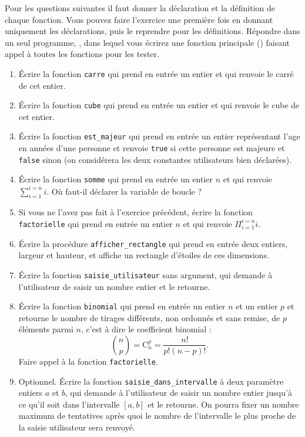 Pour les questions suivantes il faut donner la déclaration et la
définition de chaque fonction. Vous pouvez faire l'exercice une
première fois en donnant uniquement les déclarations, puis le
reprendre pour les définitions. Répondre dans un seul programme, , dans
lequel vous écrirez une fonction principale () faisant appel à
toutes les fonctions pour les tester.
\begin{enumerate}
\item Écrire la fonction \verb|carre| qui prend en entrée un entier et qui renvoie le carré de cet entier.
\item Écrire la fonction \verb|cube| qui prend en entrée un entier et qui renvoie le cube de cet entier.
\item Écrire la fonction \verb|est_majeur| qui prend en entrée un entier représentant l'age en années d'une personne et renvoie \verb|true| si cette personne est majeure et \verb|false| sinon (on considérera les deux constantes utilisateurs bien déclarées).
\item Écrire la fonction \verb|somme| qui prend en entrée un entier
  $n$ et qui renvoie $\sum_{i=1}^{i=n} i$. Où faut-il déclarer la
  variable de boucle ?
\item Si vous ne l'avez pas fait à l'exercice précédent, écrire la fonction \verb|factorielle| qui prend en entrée un entier
  $n$ et qui renvoie $\Pi_{i=1}^{i=n} i$.
\item Écrire la procédure \verb|afficher_rectangle| qui prend en
  entrée deux entiers, largeur et hauteur, et affiche un rectangle
  d'étoiles de ces dimensions.
\item Écrire la fonction \verb|saisie_utilisateur| sans argument, qui demande à l'utilisateur de saisir un nombre entier et le
  retourne.
\item Écrire la fonction \verb|binomial| qui prend en entrée un entier
  $n$ et un entier $p$ et retourne le nombre de tirages différents,
  non ordonnés et sans remise, de $p$ éléments parmi $n$, c'est à dire
  le coefficient binomial :
\[
\binom{n}{p} = \text{C}^p_n = \frac{n!}{p!(n-p)!}.
\]
Faire appel à la fonction \verb|factorielle|.
\item Optionnel. Écrire la fonction \verb|saisie_dans_intervalle| à deux
  paramètre entiers $a$ et $b$, qui demande à l'utilisateur de saisir
  un nombre entier jusqu'à ce qu'il soit dans l'intervalle $[a, b]$ et le
  retourne. On pourra fixer un nombre maximum de tentatives après quoi
  le nombre de l'intervalle le plus proche de la saisie utilisateur
  sera renvoyé.
\end{enumerate}

